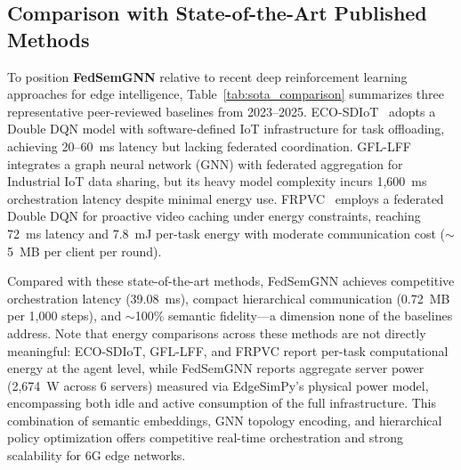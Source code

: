 \documentclass[conference]{IEEEtran}
\begin{document}
	\subsection{Comparison with State-of-the-Art Published Methods}
	\label{subsec:sota_comparison}
	
	To position \textbf{FedSemGNN} relative to recent deep reinforcement learning approaches for edge intelligence, Table~\ref{tab:sota_comparison} summarizes three representative peer-reviewed baselines from 2023--2025. 
	ECO-SDIoT~\cite{zhu2023eco} adopts a Double DQN model with software-defined IoT infrastructure for task offloading, achieving 20--60~ms latency but lacking federated coordination. 
	GFL-LFF~\cite{regan2024gfl} integrates a graph neural network (GNN) with federated aggregation for Industrial IoT data sharing, but its heavy model complexity incurs 1{,}600~ms orchestration latency despite minimal energy use. 
	FRPVC~\cite{qian2025frpvc} employs a federated Double DQN for proactive video caching under energy constraints, reaching 72~ms latency and 7.8~mJ per-task energy with moderate communication cost ($\sim$5~MB per client per round). 
	
	Compared with these state-of-the-art methods, FedSemGNN achieves competitive orchestration latency (39.08~ms), compact hierarchical communication (0.72~MB per 1{,}000 steps), and $\sim$100\% semantic fidelity---a dimension none of the baselines address. 
	Note that energy comparisons across these methods are not directly meaningful: ECO-SDIoT, GFL-LFF, and FRPVC report per-task computational energy at the agent level, while FedSemGNN reports aggregate server power (2{,}674~W across 6 servers) measured via EdgeSimPy's physical power model, encompassing both idle and active consumption of the full infrastructure.
	This combination of semantic embeddings, GNN topology encoding, and hierarchical policy optimization offers competitive real-time orchestration and strong scalability for 6G edge networks.
	
\end{document}
